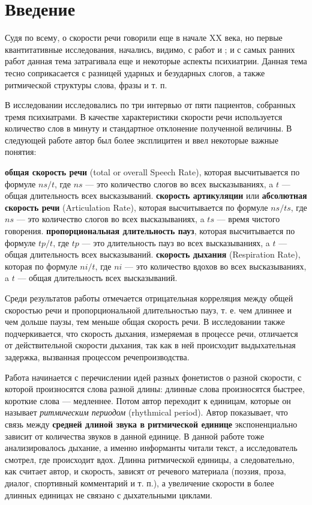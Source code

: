 \section{Введение}
\noindent Судя по всему, о скорости речи говорили еще в начале XX века, но первые квантитативные исследования, начались, видимо, с работ \citep{goldman54} и \citep{goldman56}; и с самых ранних работ данная тема затрагивала еще и некоторые аспекты психиатрии. Данная тема тесно соприкасается с разницей ударных и безударных слогов, а также ритмической структуры слова, фразы и т. п.
\par В исследовании \citep{goldman54} исследовались по три интервью от пяти пациентов, собранных тремя психиатрами. В качестве характеристики скорости речи используется количество слов в минуту и стандартное отклонение полученной величины. В следующей работе \citep{goldman56} автор был более эксплицитен и ввел некоторые важные понятия:
\begin{itemize}
\mytem \textbf{общая скорость речи} (total or overall Speech Rate), которая высчитывается по формуле ${ns}/t$, где ${ns}$ --- это количество слогов во всех высказываниях, a $t$ --- общая длительность всех высказываний.
\mytem \textbf{скорость артикуляции} или \textbf{абсолютная скорость речи} (Articulation Rate), которая высчитывается по формуле $ns/ts$, где $ns$ --- это количество слогов во всех высказываниях, a $ts$ --- время чистого говорения.
\mytem \textbf{пропорциональная длительность пауз}, которая высчитывается по формуле $tp/t$, где $tp$ --- это длительность пауз во всех высказываниях, a $t$ --- общая длительность всех высказываний.
\mytem \textbf{скорость дыхания} (Respiration Rate), которая по формуле $ni/t$, где ${ni}$ --- это количество вдохов во всех высказываниях, a $t$ --- общая длительность всех высказываний.
\end{itemize}
\par Среди результатов работы \citep{goldman56} отмечается отрицательная корреляция между общей скоростью речи и пропорциональной длительностью пауз, т. е. чем длиннее и чем дольше паузы, тем меньше общая скорость речи. В исследовании также подчеркивается, что скорость дыхания, измеряемая в процессе речи, отличается от действительной скорости дыхания, так как в ней происходит выдыхательная задержка, вызванная процессом речепроизводства.
\par Работа \citep{fonagy60} начинается с перечислении идей разных фонетистов о разной скорости, с которой произносятся слова разной длины: длинные слова произносятся быстрее, короткие слова --- медленнее. Потом автор переходит к единицам, которые он называет \textit{ритмическим периодом} (rhythmical period). Автор показывает, что связь между \textbf{средней длиной звука в ритмической единице} экспоненциально зависит от количества звуков в данной единице. В данной работе тоже анализировалось дыхание, а именно информанты читали текст, а исследователь смотрел, где происходит вдох. Длинна ритмической единицы, а следовательно, как считает автор, и скорость, зависят от речевого материала (поэзия, проза, диалог, спортивный комментарий и т. п.), а увеличение скорости в более длинных единицах не связано с дыхательными циклами. 
